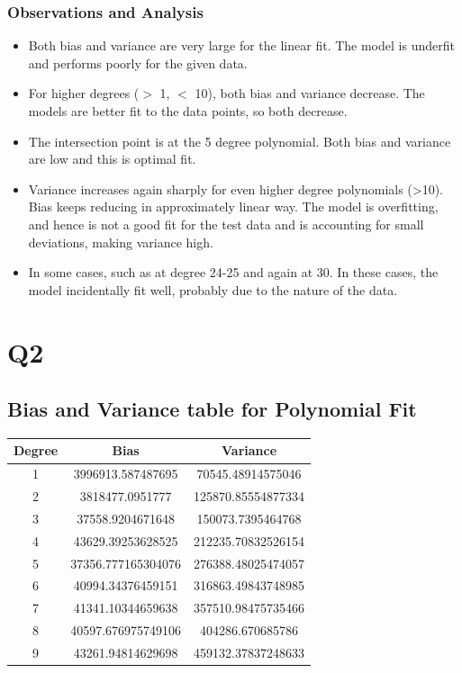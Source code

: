 \documentclass{article}
\begin{document}
\subsubsection{Observations and Analysis}
\begin{itemize}
\item Both bias and variance are very large for the linear fit. The model is underfit and performs poorly for the given data.
\item For higher degrees ($>$ 1, $<$ 10), both bias and variance decrease. The models are better fit to the data points, so both decrease.
\item The intersection point is at the 5 degree polynomial. Both bias and variance are low and this is optimal fit.
\item Variance increases again sharply for even higher degree polynomials (>10). Bias keeps reducing in approximately linear way. The model is overfitting, and hence is not a good fit for the test data and is accounting for small deviations, making variance high. 
\item In some cases, such as at degree 24-25 and again at 30. In these cases, the model incidentally fit well, probably due to the nature of the data.
\end{itemize}

\section{Q2}
\subsection{Bias and Variance table for Polynomial Fit}
\begin{center}
\begin{tabular}{ | c | c | c | }
\hline
Degree & Bias & Variance \\ 
\hline \hline
1 & 3996913.587487695 & 70545.48914575046 \\
\hline 
2 & 3818477.0951777 & 125870.85554877334 \\
\hline
3 & 37558.9204671648 & 150073.7395464768 \\
\hline
4 & 43629.39253628525 & 212235.70832526154 \\
\hline
5 & 37356.777165304076 & 276388.48025474057 \\
\hline
6 & 40994.34376459151 & 316863.49843748985 \\
\hline
7 & 41341.10344659638 & 357510.98475735466 \\
\hline
8 & 40597.676975749106 & 404286.670685786 \\
\hline
9 & 43261.94814629698 & 459132.37837248633 \\
\hline
\end{tabular}
\end{center}
\end{document}
